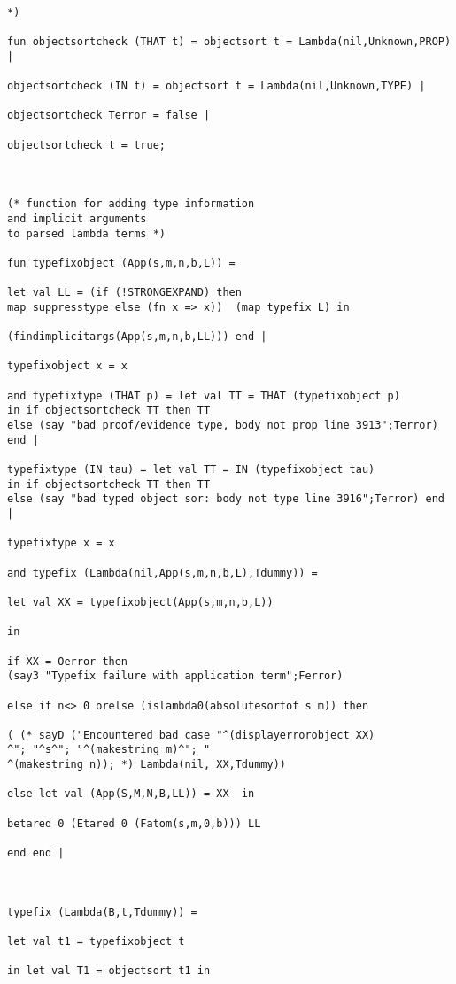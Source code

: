 \documentclass[12pt]{article}
\begin{document}
\begin{verbatim}

*)

fun objectsortcheck (THAT t) = objectsort t = Lambda(nil,Unknown,PROP) |

objectsortcheck (IN t) = objectsort t = Lambda(nil,Unknown,TYPE) |

objectsortcheck Terror = false |

objectsortcheck t = true;



(* function for adding type information 
and implicit arguments
to parsed lambda terms *)

fun typefixobject (App(s,m,n,b,L)) =

let val LL = (if (!STRONGEXPAND) then  
map suppresstype else (fn x => x))  (map typefix L) in

(findimplicitargs(App(s,m,n,b,LL))) end |

typefixobject x = x

and typefixtype (THAT p) = let val TT = THAT (typefixobject p) 
in if objectsortcheck TT then TT 
else (say "bad proof/evidence type, body not prop line 3913";Terror) end |

typefixtype (IN tau) = let val TT = IN (typefixobject tau) 
in if objectsortcheck TT then TT 
else (say "bad typed object sor: body not type line 3916";Terror) end |

typefixtype x = x 

and typefix (Lambda(nil,App(s,m,n,b,L),Tdummy)) =

let val XX = typefixobject(App(s,m,n,b,L)) 

in

if XX = Oerror then 
(say3 "Typefix failure with application term";Ferror)

else if n<> 0 orelse (islambda0(absolutesortof s m)) then

( (* sayD ("Encountered bad case "^(displayerrorobject XX)
^"; "^s^"; "^(makestring m)^"; "
^(makestring n)); *) Lambda(nil, XX,Tdummy))

else let val (App(S,M,N,B,LL)) = XX  in

betared 0 (Etared 0 (Fatom(s,m,0,b))) LL

end end |



typefix (Lambda(B,t,Tdummy)) = 

let val t1 = typefixobject t

in let val T1 = objectsort t1 in 


\end{verbatim}
\end{document}
